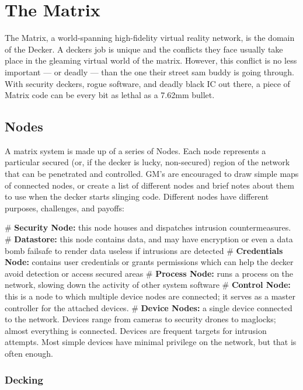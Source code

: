 \chapter{The Matrix} \label{matrix}
 
The Matrix, a world-spanning high-fidelity virtual reality network, is the domain of the Decker. A deckers job is unique and the conflicts they face usually take place in the gleaming virtual world of the matrix. However, this conflict is no less important — or deadly — than the one their street sam buddy is going through. With security deckers, rogue software, and deadly black IC out there, a piece of Matrix code can be every bit as lethal as a 7.62mm bullet.



\section{Nodes}

A matrix system is made up of a series of Nodes. Each node represents a particular secured (or, if the decker is lucky, non-secured) region of the network that can be penetrated and controlled. GM’s are encouraged to draw simple maps of connected nodes, or create a list of different nodes and brief notes about them to use when the decker starts slinging code. Different nodes have different purposes, challenges, and payoffs:
    \begin{easylist}
        # \textbf{Security Node:} this node houses and dispatches intrusion countermeasures.
        # \textbf{Datastore:} this node contains data, and may have encryption or even a data bomb failsafe to render data useless if intrusions are detected
        # \textbf{Credentials Node:} contains user credentials or grants permissions which can help the decker avoid detection or access secured areas
        # \textbf{Process Node:} runs a process on the network, slowing down the activity of other system software
        # \textbf{Control Node:} this is a node to which multiple device nodes are connected; it serves as a master controller for the attached devices.
        # \textbf{Device Nodes:} a single device connected to the network. Devices range from cameras to security drones to maglocks; almost everything is connected. Devices are frequent targets for intrusion attempts. Most simple devices have minimal privilege on the network, but that is often enough.
    \end{easylist}


\subsection{Decking}

